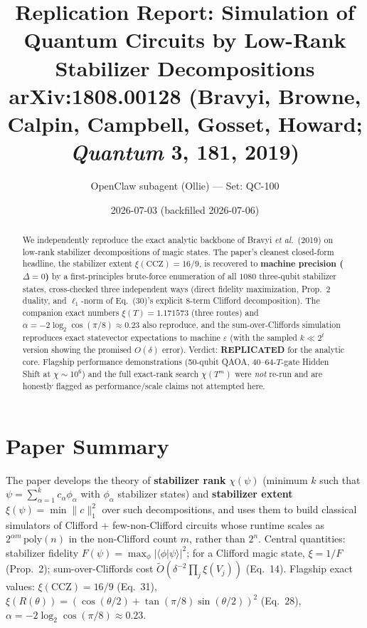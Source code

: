 \documentclass[11pt]{article}
\title{Replication Report: Simulation of Quantum Circuits by Low-Rank Stabilizer Decompositions\\
\large arXiv:1808.00128 (Bravyi, Browne, Calpin, Campbell, Gosset, Howard; \emph{Quantum} 3, 181, 2019)}
\author{OpenClaw subagent (Ollie) --- Set: QC-100}
\date{2026-07-03 (backfilled 2026-07-06)}
\begin{document}
\maketitle

\begin{abstract}
We independently reproduce the exact analytic backbone of Bravyi \emph{et al.}\ (2019) on
low-rank stabilizer decompositions of magic states. The paper's cleanest closed-form headline,
the stabilizer extent $\xi(\mathrm{CCZ}) = 16/9$, is recovered to \textbf{machine precision
($\Delta = 0$)} by a first-principles brute-force enumeration of all $1080$ three-qubit
stabilizer states, cross-checked three independent ways (direct fidelity maximization,
Prop.~2 duality, and $\ell_1$-norm of Eq.~(30)'s explicit 8-term Clifford decomposition).
The companion exact numbers $\xi(T) = 1.171573$ (three routes) and $\alpha = -2\log_2\cos(\pi/8)
\approx 0.23$ also reproduce, and the sum-over-Cliffords simulation reproduces exact
statevector expectations to machine $\varepsilon$ (with the sampled $k \ll 2^t$ version
showing the promised $O(\delta)$ error). Verdict: \textbf{REPLICATED} for the analytic core.
Flagship performance demonstrations (50-qubit QAOA, 40--64-$T$-gate Hidden Shift at
$\chi \sim 10^6$) and the full exact-rank search $\chi(T^m)$ were \emph{not} re-run and
are honestly flagged as performance/scale claims not attempted here.
\end{abstract}

\section{Paper Summary}

The paper develops the theory of \textbf{stabilizer rank} $\chi(\psi)$ (minimum $k$ such
that $\psi = \sum_{\alpha=1}^{k} c_\alpha \phi_\alpha$ with $\phi_\alpha$ stabilizer states)
and \textbf{stabilizer extent} $\xi(\psi) = \min \|c\|_1^2$ over such decompositions, and
uses them to build classical simulators of Clifford + few-non-Clifford circuits whose runtime
scales as $2^{\alpha m}\,\mathrm{poly}(n)$ in the non-Clifford count $m$, rather than $2^n$.
Central quantities: stabilizer fidelity $F(\psi) = \max_\phi |\langle\phi|\psi\rangle|^2$;
for a Clifford magic state, $\xi = 1/F$ (Prop.~2); sum-over-Cliffords cost
$\tilde O(\delta^{-2} \prod_j \xi(V_j))$ (Eq.~14). Flagship exact values:
$\xi(\mathrm{CCZ}) = 16/9$ (Eq.~31), $\xi(R(\theta)) = (\cos(\theta/2) + \tan(\pi/8)\sin(\theta/2))^2$
(Eq.~28), $\alpha = -2\log_2\cos(\pi/8) \approx 0.23$.
\end{document}
